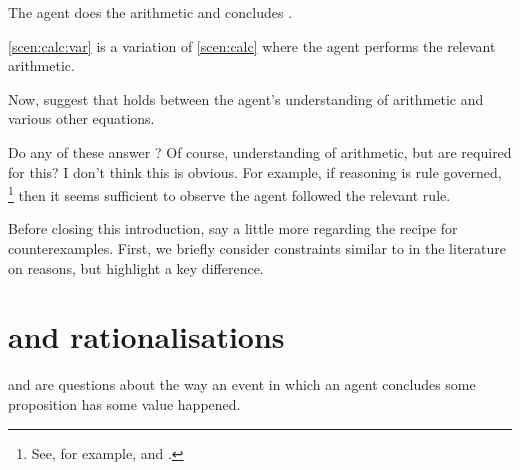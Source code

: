 \begin{note}
\begin{scenario}[Multiplication]
    The agent does the arithmetic and concludes \propM{\gistCalcEq{}}.
  \end{scenario}

  \autoref{scen:calc:var} is a variation of \autoref{scen:calc} where the agent performs the relevant arithmetic.

  Now, suggest that \ros{} holds between the agent's understanding of arithmetic and various other equations.

  Do any of these \ros{} answer \qWhy{}?
  Of course, understanding of arithmetic, but are \ros{} required for this?
  I don't think this is obvious.
  For example, if reasoning is rule governed,%
  \footnote{
    See, for example, \textcite{Boghossian:2008vf} and \textcite{Broome:2013aa}.
  }
  then it seems sufficient to observe the agent followed the relevant rule.
\end{note}

\begin{note}
  Before closing this introduction, say a little more regarding the recipe for counterexamples.
  First, we briefly consider constraints similar to \issueInclusion{} in the literature on reasons, but highlight a key difference.
\end{note}

\section*{\issueInclusion{} and rationalisations}
\label{sec:reasons}

\begin{note}
  \qWhy{} and \qHow{} are questions about the way an event in which an agent concludes some proposition has some value happened.
\end{note}

